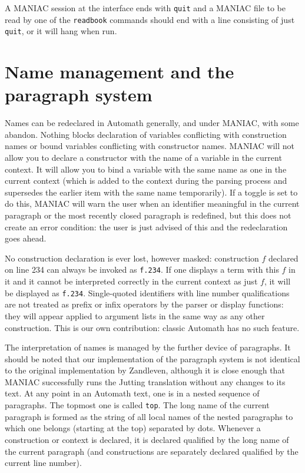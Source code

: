 \documentclass[12pt]{article}
\begin{document}
A MANIAC session at the interface ends with {\tt quit} and a MANIAC file to be read by one of the {\tt readbook} commands should end with a line consisting of just {\tt quit}, or it will hang when run.


\newpage

\section{Name management and the paragraph system}



Names can be redeclared in Automath generally, and under MANIAC, with some abandon.  Nothing blocks declaration of variables conflicting with construction names or bound variables
conflicting with constructor names.  MANIAC will not allow you to declare a constructor with the name of a variable in the current context.  It will allow you to bind a variable
with the same name as one in the current context (which is added to the context during the parsing process and supersedes the earlier item with the same name temporarily).   If a toggle is set to do this, MANIAC will warn the user when an identifier meaningful in the current paragraph or the most recently closed paragraph is redefined, but this does not create an error condition:  the user is just advised of this and the redeclaration goes ahead.

No construction declaration is ever lost, however masked:  construction $f$ declared on line 234 can always be invoked as {\tt f.234}.  If one displays a term with this $f$ in it and it cannot be interpreted correctly in the current context as just $f$, it will be displayed as {\tt f.234}.  Single-quoted identifiers with line number qualifications are not treated as prefix or infix operators by the parser or display functions:  they will appear applied to argument lists in the same way as any other construction.  This is our own contribution:  classic Automath has no such feature.

The interpretation of names is managed by the further device of paragraphs.   It should be noted that our implementation of the paragraph system is not identical to the original implementation by Zandleven, although it is close enough that MANIAC successfully runs the Jutting translation without any changes to its text.   At any point in an Automath text, one is in a nested sequence of paragraphs.  The topmost one
is called {\tt top}.  The long name of the current paragraph is formed as the string of all local names of the nested paragraphs to which one belongs (starting at the top) separated by dots.
Whenever a construction or context is declared, it is declared qualified by the long name of the current paragraph (and constructions are separately declared qualified by the current line number).
\end{document}
